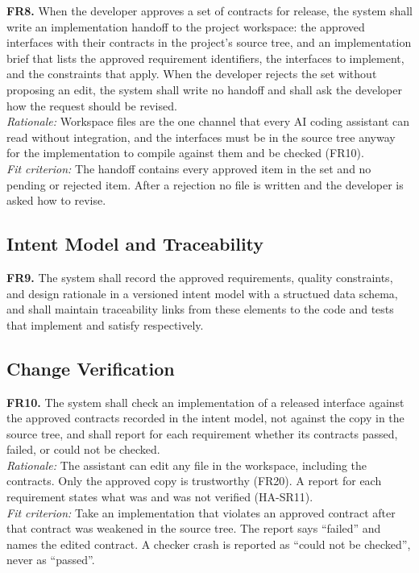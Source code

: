 \documentclass[12pt]{article}
\begin{document}
\medskip
\noindent\textbf{FR8.} When the developer approves a set of contracts for release,
the system shall write an implementation handoff to the project workspace: the
approved interfaces with their contracts in the project's source tree, and an
implementation brief that lists the approved requirement identifiers, the
interfaces to implement, and the constraints that apply. When the developer
rejects the set without proposing an edit, the system shall write no handoff and
shall ask the developer how the request should be revised.\\
\textit{Rationale:} Workspace files are the one channel that every AI coding
assistant can read without integration, and the interfaces must be in the
source tree anyway for the implementation to compile against them and be
checked (FR10).\\
\textit{Fit criterion:} The handoff contains every approved item in the set and
no pending or rejected item. After a rejection no file is written and the
developer is asked how to revise. 

\subsection{Intent Model and Traceability}

\medskip
\noindent\textbf{FR9.} The system shall record the approved requirements,
quality constraints, and design rationale in a versioned intent model with a structued data schema, and shall
maintain traceability links from these elements to the code and tests that
implement and satisfy respectively.

\subsection{Change Verification}

\medskip
\noindent\textbf{FR10.} The system shall check an implementation of a released
interface against the approved contracts recorded in the intent model, not
against the copy in the source tree, and shall report for each requirement
whether its contracts passed, failed, or could not be checked.\\
\textit{Rationale:} The assistant can edit any file in the workspace, including
the contracts. Only the approved copy is trustworthy (FR20). A report for each
requirement states what was and was not verified (HA-SR11).\\
\textit{Fit criterion:} Take an implementation that violates an approved
contract after that contract was weakened in the source tree. The report says
``failed'' and names the edited contract. A checker crash is reported as
``could not be checked'', never as ``passed''.
\end{document}

